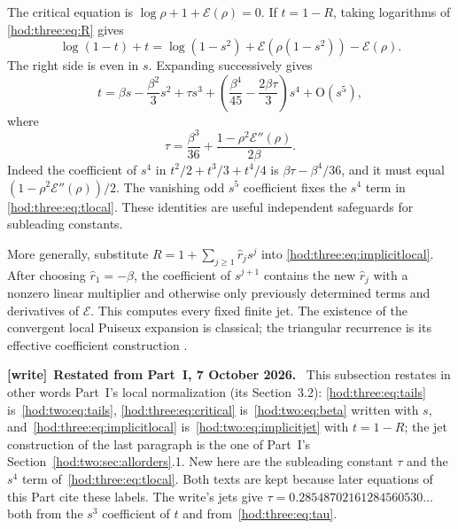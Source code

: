 \documentclass[11pt,letterpaper]{article}
\theoremstyle{definition}\newtheorem{definition}[theorem]{Definition}
\theoremstyle{remark}\newtheorem{remark}[theorem]{Remark}
\newcommand{\Ecal}{\mathcal E}
\newcommand{\OO}{\mathrm O}
\newenvironment{writenote}[1][]{\par\smallskip\begingroup\small
 \noindent\textbf{[write]}\if\relax\detokenize{#1}\relax\else~\textbf{#1.}\fi\ }%
 {\par\endgroup\smallskip}
\begin{document}
The critical equation is $\log\rho+1+\Ecal(\rho)=0$. If $t=1-R$, taking logarithms of \eqref{hod:three:eq:R} gives
\begin{equation}\label{hod:three:eq:implicitlocal}
\log(1-t)+t=\log(1-s^2)+\Ecal(\rho(1-s^2))-\Ecal(\rho).
\end{equation}
The right side is even in $s$. Expanding successively gives
\begin{equation}\label{hod:three:eq:tlocal}
t=\beta s-\frac{\beta^2}{3}s^2+\tau s^3+
\left(\frac{\beta^4}{45}-\frac{2\beta\tau}{3}\right)s^4+\OO(s^5),
\end{equation}
where
\begin{equation}\label{hod:three:eq:tau}
\tau=\frac{\beta^3}{36}+\frac{1-\rho^2\Ecal''(\rho)}{2\beta}.
\end{equation}
Indeed the coefficient of $s^4$ in $t^2/2+t^3/3+t^4/4$ is $\beta\tau-\beta^4/36$, and it must equal $(1-\rho^2\Ecal''(\rho))/2$. The vanishing odd $s^5$ coefficient fixes the $s^4$ term in \eqref{hod:three:eq:tlocal}. These identities are useful independent safeguards for subleading constants.

More generally, substitute $R=1+\sum_{j\ge1}\widehat r_js^j$ into \eqref{hod:three:eq:implicitlocal}. After choosing $\widehat r_1=-\beta$, the coefficient of $s^{j+1}$ contains the new $\widehat r_j$ with a nonzero linear multiplier and otherwise only previously determined terms and derivatives of $\Ecal$. This computes every fixed finite jet. The existence of the convergent local Puiseux expansion is classical; the triangular recurrence is its effective coefficient construction \cite{genitrini}.
\begin{writenote}[Restated from Part~I, 7 October 2026]
This subsection restates in other words Part~I's local normalization
(its Section~3.2): \eqref{hod:three:eq:tails}
is~\eqref{hod:two:eq:tails}, \eqref{hod:three:eq:critical}
is~\eqref{hod:two:eq:beta} written with $s$, and~\eqref{hod:three:eq:implicitlocal}
is~\eqref{hod:two:eq:implicitjet} with $t=1-R$; the jet construction of the
last paragraph is the one of Part~I's Section~\ref{hod:two:sec:allorders}.1.
New here are the subleading constant $\tau$ and the $s^4$ term
of~\eqref{hod:three:eq:tlocal}. Both texts are kept because later equations of
this Part cite these labels. The write's jets give
$\tau=0.28548702161284560530\ldots$ both from the $s^3$ coefficient of $t$ and
from~\eqref{hod:three:eq:tau}.
\end{writenote}
\end{document}
